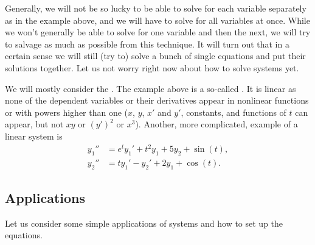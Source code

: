 Generally, we will not be so lucky to be able to solve for
each variable separately as in the 
example above, and we will have to solve for all variables at once.
While we won't generally be able to solve for one variable and then the
next, we will try to salvage as much as possible from this technique.
It will turn out that in a certain sense we will still (try to) solve
a bunch of single equations and put their solutions together.  Let us not
worry right now about how to solve systems yet.

We will mostly consider the \emph{}.  The example
above is a so-called \emph{}.
It is linear as none of the dependent variables or their derivatives
appear in nonlinear functions or with powers
higher than one ($x$, $y$, $x'$ and $y'$, constants, and functions of $t$
can appear, but not $xy$ or ${(y')}^2$ or $x^3$).  Another, more
complicated, example of a linear system is
\begin{equation*}
\begin{aligned}
y_1'' &= e^t y_1' + t^2 y_1 + 5 y_2 + \sin(t), \\
y_2'' &= t y_1'-y_2' + 2 y_1 + \cos(t).
\end{aligned}
\end{equation*}

\subsection{Applications}

Let us consider some simple applications of systems and how to set up the
equations.

